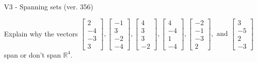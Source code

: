 \begin{exercise}
  \begin{exerciseTitle}V3 - Spanning sets (ver. 356)\end{exerciseTitle}
  \begin{exerciseStatement}
    Explain why the vectors \(\left[\begin{array}{r}
2 \\
-4 \\
-3 \\
3
\end{array}\right] , \left[\begin{array}{r}
-1 \\
3 \\
-2 \\
-4
\end{array}\right] , \left[\begin{array}{r}
4 \\
3 \\
3 \\
-2
\end{array}\right] , \left[\begin{array}{r}
4 \\
-4 \\
1 \\
-4
\end{array}\right] , \left[\begin{array}{r}
-2 \\
-1 \\
-3 \\
2
\end{array}\right] , \text{ and } \left[\begin{array}{r}
3 \\
-5 \\
2 \\
-3
\end{array}\right]\) span or don't span \(\mathbb{R}^4\). 
	



\end{exerciseStatement}
\end{exercise}
